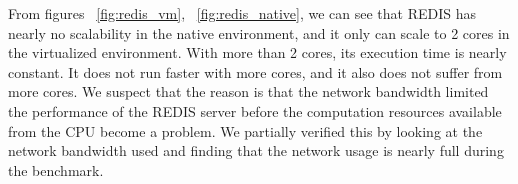 From figures ~\ref{fig:redis_vm}, ~\ref{fig:redis_native}, we can see
that REDIS has nearly no scalability in the native environment, and it
only can scale to 2 cores in the virtualized environment. With more than
2 cores, its execution time is nearly constant. It does not run faster
with more cores, and it also does not suffer from more cores. We suspect
that the reason is that the network bandwidth limited the performance
of the REDIS server before the computation resources available from the
CPU become a problem. We partially verified this by looking at the network
bandwidth used and finding that the network usage is nearly full during
the benchmark.



